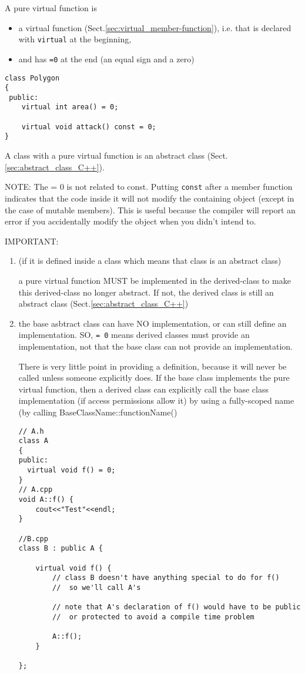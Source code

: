 A pure virtual function is
\begin{itemize}
  
  \item  a virtual function
(Sect.\ref{sec:virtual_member-function}), i.e. that is declared with
\verb!virtual! at the beginning,

  \item and has \verb!=0! at the end (an equal sign and a zero)
\end{itemize}

\begin{verbatim}
class Polygon
{
 public:
    virtual int area() = 0;
    
    virtual void attack() const = 0;
}
\end{verbatim}
A class with a pure virtual function is an abstract class
(Sect.\ref{sec:abstract_class_C++}).

NOTE: The = 0 is not related to const. Putting \verb!const! after a member
function indicates that the code inside it will not modify the containing object
(except in the case of mutable members).
This is useful because the compiler will report an error if you accidentally
modify the object when you didn't intend to.



IMPORTANT:
\begin{enumerate}
  
  \item (if it is defined inside a class which means that class is an abstract class) 
  
  a pure virtual function MUST be implemented in the derived-class to make this
  derived-class no longer abstract. If not, the derived class is still an
  abstract class (Sect.\ref{sec:abstract_class_C++}) 
  
  \item the base asbtract class can have NO implementation, or can still define
  an implementation. SO, \verb!= 0! means derived classes must provide an
  implementation, not that the base class can not provide an implementation.
  
  There is very little point in providing a definition, because it will never
  be called unless someone explicitly does. If the base class implements the pure
  virtual function, then a derived class can explicitly call the base class
  implementation (if access permissions allow it) by using a fully-scoped name
  (by calling BaseClassName::functionName()

\begin{verbatim}
// A.h
class A 
{
public:
  virtual void f() = 0;
}
// A.cpp
void A::f() {
    cout<<"Test"<<endl;
}

//B.cpp
class B : public A {

    virtual void f() {
        // class B doesn't have anything special to do for f()
        //  so we'll call A's

        // note that A's declaration of f() would have to be public 
        //  or protected to avoid a compile time problem

        A::f();
    }

};
\end{verbatim}  
\end{enumerate}


